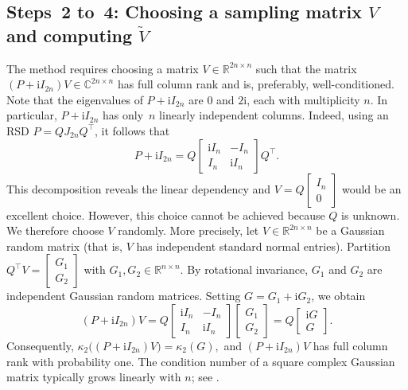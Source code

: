 \documentclass[final,onefignum,onetabnum,dvipsnames]{siamart251216}
\numberwithin{algorithm}{section}
\numberwithin{equation}{section}
\begin{document}
\subsection{Steps~2 to~4: Choosing a sampling matrix $V$ and computing $\widetilde{V}$}
The method requires choosing a matrix $V\in\mathbb{R}^{2n\times n}$ such that the matrix $(P+\mathrm{i} I_{2n})V\in\mathbb{C}^{2n\times n}$ has full column rank and is, preferably, well-conditioned. Note that the eigenvalues of $P+\mathrm{i}I_{2n}$ are $0$ and $2 \mathrm{i}$, each with multiplicity $n$. In particular, $P+\mathrm{i} I_{2n}$ has only~$n$ linearly independent columns. Indeed, using an RSD $P = QJ_{2n}Q^\top$, it follows that
\begin{equation*}
    P + \mathrm{i} I_{2n} = Q\begin{bmatrix}
        \mathrm{i} I_n&-I_n\\
        I_n& \mathrm{i} I_n
    \end{bmatrix}Q^\top.
\end{equation*}
This decomposition reveals the linear dependency and $V = Q\left[\begin{smallmatrix}
        I_n\\
        0
    \end{smallmatrix}\right]$ would be an excellent choice. However, this choice cannot be achieved because $Q$ is unknown. 
    We therefore choose $V$ randomly. More precisely, let
$V\in\mathbb R^{2n\times n}$ be a Gaussian random matrix (that is, $V$ has independent standard normal entries).
Partition
$Q^\top V
    =
    \begin{bmatrix}
        G_1\\G_2
    \end{bmatrix}$ with 
    $G_1,G_2\in\mathbb R^{n\times n}$.
By rotational invariance, $G_1$ and $G_2$ are independent Gaussian random matrices. Setting $G=G_1+\mathrm{i}G_2$, we obtain
\[
    (P+\mathrm{i}I_{2n})V
    =
    Q
    \begin{bmatrix}
        \mathrm{i}I_n&-I_n\\
        I_n&\mathrm{i}I_n
    \end{bmatrix}
    \begin{bmatrix}
        G_1\\G_2
    \end{bmatrix}
    =
    Q
    \begin{bmatrix}
        \mathrm{i}G\\G
    \end{bmatrix}.
\]
Consequently,
$
    \kappa_2\bigl((P+\mathrm{i}I_{2n})V\bigr)
    =
    \kappa_2(G),
$
and $(P+\mathrm{i}I_{2n})V$ has full column rank with probability one.
The condition number of a square complex Gaussian matrix typically
grows linearly with $n$; see
\cite[Thm.~6.2]{Edelman1988RandomEigenvalues}.
    
\end{document}
